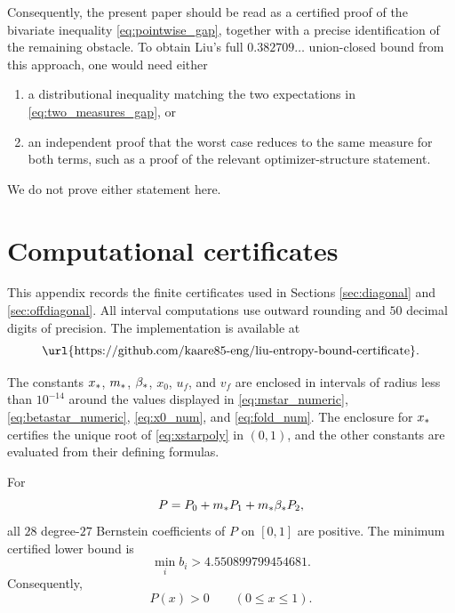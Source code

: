 Consequently, the present paper should be read as a certified proof of the
bivariate inequality \eqref{eq:pointwise_gap}, together with a precise
identification of the remaining obstacle.  To obtain Liu's full
\(0.382709\ldots\) union-closed bound from this approach, one would need either
\begin{enumerate}
  \item a distributional inequality matching the two expectations in
  \eqref{eq:two_measures_gap}, or
  \item an independent proof that the worst case reduces to the same measure
  for both terms, such as a proof of the relevant optimizer-structure
  statement.
\end{enumerate}
We do not prove either statement here.

\appendix
\section{Computational certificates}\label{app:certificates}

This appendix records the finite certificates used in Sections
\ref{sec:diagonal} and \ref{sec:offdiagonal}.  All interval computations use
outward rounding and \(50\) decimal digits of precision.  The implementation is
available at
\begin{equation}\label{eq:code_url}
  \text{\url{https://github.com/kaare85-eng/liu-entropy-bound-certificate}}.
\end{equation}

\begin{proposition}\label{prop:A1}
The constants \(x_*\), \(m_*\), \(\beta_*\), \(x_0\), \(u_f\), and \(v_f\)
are enclosed in intervals of radius less than \(10^{-14}\) around the values
displayed in \eqref{eq:mstar_numeric}, \eqref{eq:betastar_numeric},
\eqref{eq:x0_num}, and \eqref{eq:fold_num}.  The enclosure for \(x_*\)
certifies the unique root of \eqref{eq:xstarpoly} in \((0,1)\), and the other
constants are evaluated from their defining formulas.
\end{proposition}

\begin{proposition}\label{prop:A2}
For
\[
  P=P_0+m_* P_1+m_*\beta_* P_2,
\]
all \(28\) degree-\(27\) Bernstein coefficients of \(P\) on \([0,1]\) are
positive.  The minimum certified lower bound is
\begin{equation}\label{eq:min_bern_app}
  \min_i b_i>4.550899799454681.
\end{equation}
Consequently,
\[
  P(x)>0\qquad(0\le x\le1).
\]
\end{proposition}


